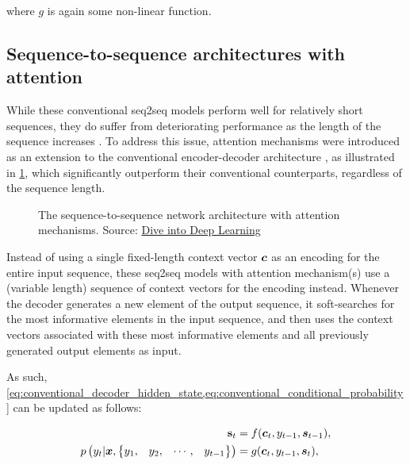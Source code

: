 where $g$ is again some non-linear function.


\subsection{Sequence-to-sequence architectures with attention}

While these conventional \gls{seq2seq} models perform well for relatively short sequences, they do suffer from deteriorating performance as the length of the sequence increases \citep{cho2014properties}. To address this issue, attention mechanisms were introduced as an extension to the conventional encoder-decoder architecture \citep{bahdanau2014neural,luong2015effective}, as illustrated in \cref{fig:seq2seq_with_attention_model_architecture}, which significantly outperform their conventional counterparts, regardless of the sequence length.

\begin{figure}[ht!]
    \centering
    \def\svgscale{0.8}
    
    \caption[The seq2seq network architecture with attention mechanisms]{The sequence-to-sequence network architecture with attention mechanisms. Source: \href{https://d2l.ai/chapter_attention-mechanisms/bahdanau-attention.html}{Dive into Deep Learning}}
    \label{fig:seq2seq_with_attention_model_architecture}
\end{figure}

Instead of using a single fixed-length context vector $\cvect$ as an encoding for the entire input sequence, these \gls{seq2seq} models with attention mechanism(s) use a (variable length) sequence of context vectors for the encoding instead. Whenever the decoder generates a new element of the output sequence, it soft-searches for the most informative elements in the input sequence, and then uses the context vectors associated with these most informative elements and all previously generated output elements as input.

As such, \cref{eq:conventional_decoder_hidden_state,eq:conventional_conditional_probability} can be updated as follows:

\begin{align}
    \svect_t &= f(\cvect_t, y_{t-1}, \svect_{t-1}), \\
    \label{eq:attentative_conditional_probability}
    p\left( y_t | \xvect, \begin{Bmatrix} y_1, & y_2, & \cdots, & y_{t-1} \end{Bmatrix} \right) &= g(\cvect_t, y_{t-1}, \svect_t),
\end{align}

